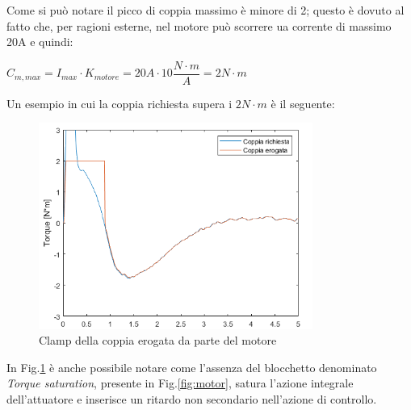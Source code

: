 Come si può notare il picco di coppia massimo è minore di 2; questo è dovuto al fatto che, per ragioni esterne, nel motore può scorrere ua corrente di massimo 20A e quindi:
\begin{center}
	$C_{m,max} = I_{max}\cdot{K_{motore}} = 20 A\cdot{10 \dfrac{N\cdot{m}}{A}}=2N\cdot{m}$
\end{center}

Un esempio in cui la coppia richiesta supera i $2N\cdot{m}$ è il seguente:
\begin{figure}[H]
	\centering   	
	\includegraphics[width=0.8\textwidth]{Immagini/saturazione.png}
	\caption{Clamp della coppia erogata da parte del motore}
	\label{fig:clamp_motore}
\end{figure}
In Fig.\ref{fig:clamp_motore} è anche possibile notare come l'assenza del blocchetto denominato \textit{Torque saturation}, presente in Fig.\ref{fig:motor}, satura l'azione integrale dell'attuatore e inserisce un ritardo non secondario nell'azione di controllo.
